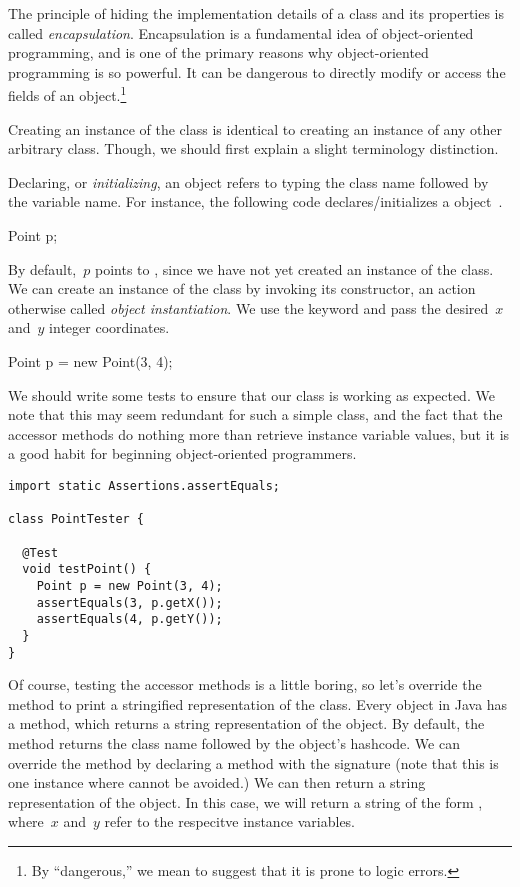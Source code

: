 The principle of hiding the implementation details of a class and its properties is called \emph{encapsulation}. 
Encapsulation is a fundamental idea of object-oriented programming, and is one of the primary reasons why object-oriented programming is so powerful. 
It can be dangerous to directly modify or access the fields of an object.\footnote{By ``dangerous,'' we mean to suggest that it is prone to logic errors.} 

Creating an instance of the  class is identical to creating an instance of any other arbitrary class.
Though, we should first explain a slight terminology distinction.

Declaring, or \emph{initializing}, an object refers to typing the class name followed by the variable name. 
For instance, the following code declares/initializes a  object~.

\begin{verbnobox}[\small]
Point p;
\end{verbnobox}

By default,~$p$ points to , since we have not yet created an instance of the  class. 
We can create an instance of the  class by invoking its constructor, an action otherwise called \emph{object instantiation}. 
We use the  keyword and pass the desired~$x$ and~$y$ integer coordinates. 

\begin{verbnobox}[\small]
Point p = new Point(3, 4);
\end{verbnobox}

We should write some tests to ensure that our  class is working as expected. 
We note that this may seem redundant for such a simple class, and the fact that the accessor methods do nothing more than retrieve instance variable values, but it is a good habit for beginning object-oriented programmers.

\begin{lstlisting}[language=MyJava]
import static Assertions.assertEquals;

class PointTester {
  
  @Test
  void testPoint() {
    Point p = new Point(3, 4);
    assertEquals(3, p.getX());
    assertEquals(4, p.getY());
  }
}
\end{lstlisting}

Of course, testing the accessor methods is a little boring, so let's override the  method to print a stringified representation of the  class. 
Every object in Java has a  method, which returns a string representation of the object. 
By default, the  method returns the class name followed by the object's hashcode. 
We can override the  method by declaring a method with the signature  (note that this is one instance where  cannot be avoided.) 
We can then return a string representation of the object. 
In this case, we will return a string of the form , where~$x$ and~$y$ refer to the respecitve instance variables. 

